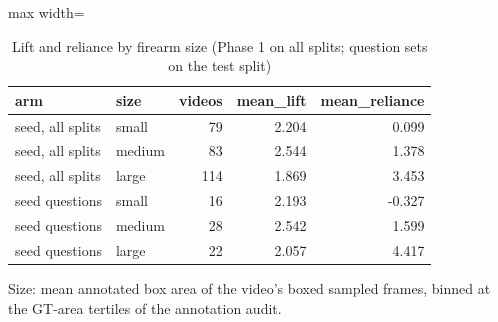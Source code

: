\begin{table}[htbp]
\centering
\scriptsize
\caption{Lift and reliance by firearm size (Phase 1 on all splits; question sets on the test split)}\label{tab:R6}
\begin{adjustbox}{max width=\textwidth}
\begin{tabular}{llrrr}
\toprule
arm & size & videos & mean\_\allowbreak{}lift & mean\_\allowbreak{}reliance \\
\midrule
seed, all splits & small & 79 & 2.204 & 0.099 \\
seed, all splits & medium & 83 & 2.544 & 1.378 \\
seed, all splits & large & 114 & 1.869 & 3.453 \\
seed questions & small & 16 & 2.193 & -0.327 \\
seed questions & medium & 28 & 2.542 & 1.599 \\
seed questions & large & 22 & 2.057 & 4.417 \\
\bottomrule
\end{tabular}
\end{adjustbox}
\par\smallskip\parbox{\textwidth}{\footnotesize Size: mean annotated box area of the video's boxed sampled frames, binned at the GT-area tertiles of the annotation audit.}
\end{table}
